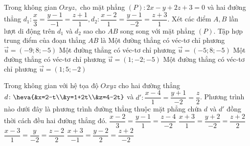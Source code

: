 \begin{ex}%
	Trong không gian $Oxyz,$ cho mặt phẳng $(P)\colon 2x-y+2z+3=0$ và hai đường thẳng $d_1\colon \dfrac{x}{3}=\dfrac{y-1}{-1}=\dfrac{z+1}{1}, d_2\colon \dfrac{x-2}{1}=\dfrac{y-1}{-2}=\dfrac{z+3}{1}$. Xét các điểm $A, B$ lần lượt di động trên $d_1$ và $d_2$ sao cho $AB$ song song với mặt phẳng $(P)$. Tập hợp trung điểm của đoạn thẳng $AB$ là
	\choice
	{\True Một đường thẳng có véc-tơ chỉ phương $\overrightarrow{u}=(-9;8;-5)$ }
	{Một đường thẳng có véc-tơ chỉ phương $\overrightarrow{u}=(-5;8;-5)$ }
	{Một đường thẳng có véc-tơ chỉ phương $\overrightarrow{u}=(1;-2;-5)$ }
	{Một đường thẳng có véc-tơ chỉ phương $\overrightarrow{u}=(1;5;-2)$ }
\end{ex}
\begin{ex}%
	Trong không gian với hệ tọa độ $Oxyz$ cho hai đường thẳng $d\colon \heva{&x=2-t\\&y=1+2t\\&z=4-2t}$ và $d'\colon\dfrac{x-4}{1}=\dfrac{y+1}{-2}=\dfrac{z}{2}$. Phương trình nào dưới đây là phương trình đường thẳng thuộc mặt phẳng chứa $d$ và $d'$ đồng thời cách đều hai đường thẳng đó.
	\choice
	{$\dfrac{x-2}{3}=\dfrac{y-1}{1}=\dfrac{z-4}{-2}$}
	{$\dfrac{x+3}{1}=\dfrac{y+2}{-2}=\dfrac{z+2}{2}$}
	{\True $\dfrac{x-3}{1}=\dfrac{y}{-2}=\dfrac{z-2}{2}$}
	{$\dfrac{x+3}{-1}=\dfrac{y-2}{2}=\dfrac{z+2}{-2}$}
\end{ex}
